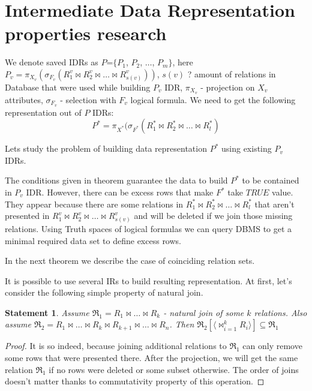 \documentclass[10pt,journal,cspaper,compsoc]{IEEEtran}
\newtheorem{statement}{Statement}
\def \n #1{\mathit{#1}}
\begin{document}
\section{Intermediate Data Representation properties research}

We denote saved IDRs as $P$=$\{ P_1$, $P_2$, $\dots$, $P_m \}$, here $P_v =
\pi_{X_v}(\sigma_{F_v} (R^v_1 \Join R^v_2 \Join \dots \Join R^v_{s(v)} ))$,
$s(v)$ ? amount of relations in Database that were used while building $P_v$
IDR, $\pi_{X_v}$ - projection on $X_v$ attributes, $\sigma_{F_v}$ - selection
with $F_v$ logical formula. We need to get the following representation out of
$P$ IDRs: $$P^{\ast} = \pi_{X^{\ast}}(\sigma_{F^{\ast}} (R^{\ast}_1 \Join
R^{\ast}_2\Join\dots \Join R^{\ast}_l )$$

Lets study the problem of building data representation $P^{\ast}$ using existing
$P_v$ IDRs.



The conditions given in theorem guarantee the data to build $P^{\ast}$ to be
contained in $P_v$ IDR. However, there can be excess rows that make $F^{\ast}$
take $\n{TRUE}$ value. They appear because there are some relations in
$R^{\ast}_1 \Join R^{\ast}_2\Join \dots \Join R^{\ast}_l $ that aren't
presented in $R^v_1 \Join R^v_2 \Join \dots \Join R^v_{s(v)} $ and will be
deleted if we join those missing relations. Using Truth spaces of logical
formulas we can query DBMS to get a minimal required data set to define excess
rows.

In the next theorem we describe the case of coinciding relation sets.



It is possible to use several IRs to build resulting representation. At first,
let's consider the following simple property of natural join.

\begin{statement}
Assume $\Re_1 = R_1 \Join \dots \Join R_k$ - natural join of some $k$ relations.
Also assume $\Re_2 = R_1 \Join \dots \Join R_k \Join R_{k+1} \Join \dots \Join
R_{n}$. Then $\Re_2 [\langle \Join_{i=1}^{k} R_i \rangle] \subseteq \Re_1$
\label{join_property}
\end{statement}
\begin{proof}
It is so indeed, because joining additional relations to $\Re_1$ can only
remove some rows that were presented there. After the projection, we will get
the same relation $\Re_1$ if no rows were deleted or some subset otherwise. The
order of joins doesn't matter thanks to commutativity property of this
operation.
\end{proof}
\end{document}
